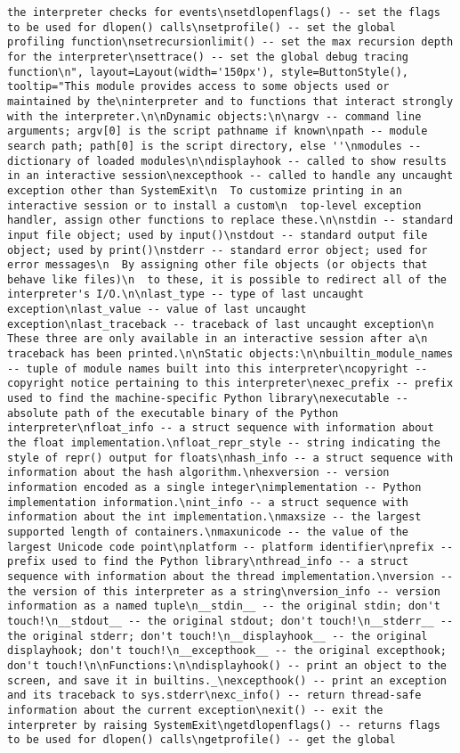 \documentclass[11pt]{article}
\begin{document}
\begin{verbatim}
the interpreter checks for events\nsetdlopenflags() -- set the flags to be used for dlopen() calls\nsetprofile() -- set the global profiling function\nsetrecursionlimit() -- set the max recursion depth for the interpreter\nsettrace() -- set the global debug tracing function\n", layout=Layout(width='150px'), style=ButtonStyle(), tooltip="This module provides access to some objects used or maintained by the\ninterpreter and to functions that interact strongly with the interpreter.\n\nDynamic objects:\n\nargv -- command line arguments; argv[0] is the script pathname if known\npath -- module search path; path[0] is the script directory, else ''\nmodules -- dictionary of loaded modules\n\ndisplayhook -- called to show results in an interactive session\nexcepthook -- called to handle any uncaught exception other than SystemExit\n  To customize printing in an interactive session or to install a custom\n  top-level exception handler, assign other functions to replace these.\n\nstdin -- standard input file object; used by input()\nstdout -- standard output file object; used by print()\nstderr -- standard error object; used for error messages\n  By assigning other file objects (or objects that behave like files)\n  to these, it is possible to redirect all of the interpreter's I/O.\n\nlast_type -- type of last uncaught exception\nlast_value -- value of last uncaught exception\nlast_traceback -- traceback of last uncaught exception\n  These three are only available in an interactive session after a\n  traceback has been printed.\n\nStatic objects:\n\nbuiltin_module_names -- tuple of module names built into this interpreter\ncopyright -- copyright notice pertaining to this interpreter\nexec_prefix -- prefix used to find the machine-specific Python library\nexecutable -- absolute path of the executable binary of the Python interpreter\nfloat_info -- a struct sequence with information about the float implementation.\nfloat_repr_style -- string indicating the style of repr() output for floats\nhash_info -- a struct sequence with information about the hash algorithm.\nhexversion -- version information encoded as a single integer\nimplementation -- Python implementation information.\nint_info -- a struct sequence with information about the int implementation.\nmaxsize -- the largest supported length of containers.\nmaxunicode -- the value of the largest Unicode code point\nplatform -- platform identifier\nprefix -- prefix used to find the Python library\nthread_info -- a struct sequence with information about the thread implementation.\nversion -- the version of this interpreter as a string\nversion_info -- version information as a named tuple\n__stdin__ -- the original stdin; don't touch!\n__stdout__ -- the original stdout; don't touch!\n__stderr__ -- the original stderr; don't touch!\n__displayhook__ -- the original displayhook; don't touch!\n__excepthook__ -- the original excepthook; don't touch!\n\nFunctions:\n\ndisplayhook() -- print an object to the screen, and save it in builtins._\nexcepthook() -- print an exception and its traceback to sys.stderr\nexc_info() -- return thread-safe information about the current exception\nexit() -- exit the interpreter by raising SystemExit\ngetdlopenflags() -- returns flags to be used for dlopen() calls\ngetprofile() -- get the global 
\end{verbatim}
\end{document}
